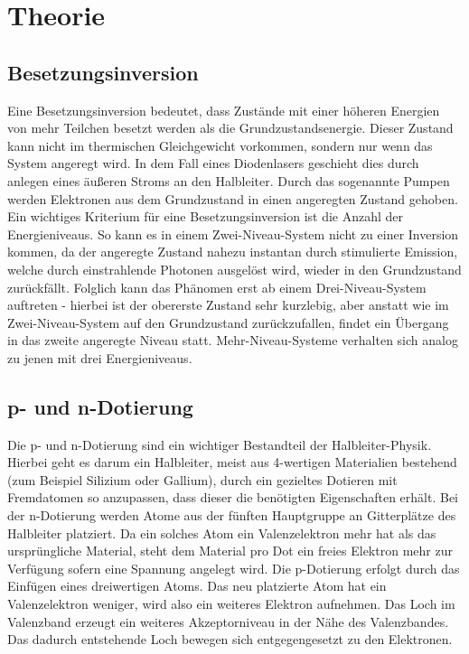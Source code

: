 \section{Theorie}
\label{sec:Theorie}

\subsection{Besetzungsinversion}
Eine Besetzungsinversion bedeutet, dass Zustände mit einer höheren Energien von mehr Teilchen besetzt werden als die Grundzustandsenergie. Dieser Zustand kann nicht im thermischen Gleichgewicht vorkommen, 
sondern nur wenn das System angeregt wird. In dem Fall eines Diodenlasers geschieht dies durch anlegen eines äußeren Stroms an den Halbleiter. Durch das sogenannte Pumpen werden Elektronen aus dem Grundzustand in einen angeregten Zustand gehoben.
Ein wichtiges Kriterium für eine Besetzungsinversion ist die Anzahl der Energieniveaus. So kann es in einem Zwei-Niveau-System nicht zu einer Inversion kommen, da der angeregte Zustand nahezu instantan durch stimulierte Emission, welche durch einstrahlende Photonen
ausgelöst wird, wieder in den Grundzustand zurückfällt. Folglich kann das Phänomen erst ab einem Drei-Niveau-System auftreten - hierbei ist der obererste Zustand sehr kurzlebig, aber anstatt wie im Zwei-Niveau-System auf den Grundzustand zurückzufallen, findet ein Übergang in das zweite angeregte
Niveau statt. Mehr-Niveau-Systeme verhalten sich analog zu jenen mit drei Energieniveaus.

\subsection{p- und n-Dotierung}
Die p- und n-Dotierung sind ein wichtiger Bestandteil der Halbleiter-Physik. Hierbei geht es darum ein Halbleiter, meist aus 4-wertigen Materialien bestehend (zum Beispiel Silizium oder Gallium), durch ein gezieltes Dotieren mit Fremdatomen so anzupassen, dass dieser die benötigten Eigenschaften erhält.
Bei der n-Dotierung werden Atome aus der fünften Hauptgruppe an Gitterplätze des Halbleiter platziert. Da ein solches Atom ein Valenzelektron mehr hat als das ursprüngliche Material, steht dem Material pro Dot ein freies Elektron mehr zur Verfügung sofern eine Spannung angelegt wird.
Die p-Dotierung erfolgt durch das Einfügen eines dreiwertigen Atoms. Das neu platzierte Atom hat ein Valenzelektron weniger, wird also ein weiteres Elektron aufnehmen. Das Loch im Valenzband erzeugt ein weiteres Akzeptorniveau in der Nähe des Valenzbandes. Das dadurch entstehende Loch bewegen sich entgegengesetzt zu den Elektronen.

